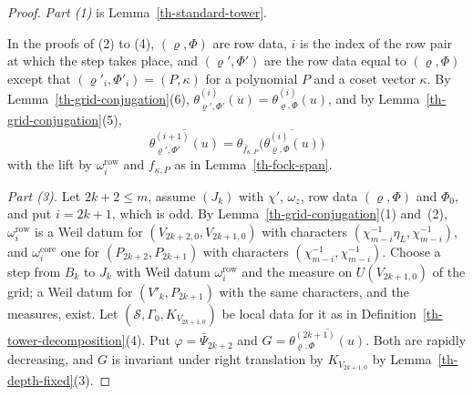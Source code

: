 \begin{proof}
\emph{Part (1)} is Lemma~\ref{th-standard-tower}.

In the proofs of (2) to (4), $(\varrho,\Phi)$ are row data, $i$ is the index of
the row pair at which the step takes place, and $(\varrho',\Phi')$ are the row
data equal to $(\varrho,\Phi)$ except that $(\varrho'_i,\Phi'_i)=(P,\kappa)$ for
a polynomial $P$ and a coset vector $\kappa$. By
Lemma~\ref{th-grid-conjugation}(6),
$\theta^{(i)}_{\varrho',\Phi'}(u)=\theta^{(i)}_{\varrho,\Phi}(u)$, and by
Lemma~\ref{th-grid-conjugation}(5),
\[
\overline{\theta^{(i+1)}_{\varrho',\Phi'}(u)}=\theta_{\bar f_{\kappa,P}}\bigl(\overline{\theta^{(i)}_{\varrho,\Phi}(u)}\bigr)\tag{$*$}
\]
with the lift by $\omega^{\mathrm{row}}_i$ and $f_{\kappa,P}$ as in
Lemma~\ref{th-fock-span}.

\emph{Part (3).} Let $2k+2\leq m$, assume $(J_k)$ with $\chi'$, $\omega_z$,
row data $(\varrho,\Phi)$ and $\Phi_0$, and put $i=2k+1$, which is odd. By
Lemma~\ref{th-grid-conjugation}(1) and~(2), $\omega^{\mathrm{row}}_i$ is a Weil
datum for $(V_{2k+2,0},V_{2k+1,0})$ with characters
$(\chi_{m-i}^{-1}\eta_L,\chi_{m-i}^{-1})$, and $\omega^{\mathrm{core}}_i$ one
for $(P_{2k+2},P_{2k+1})$ with characters $(\chi_{m-i}^{-1},\chi_{m-i}^{-1})$.
Choose a step from $B_k$ to $J_k$ with Weil datum $\omega^{\mathrm{row}}_i$ and
the measure on $U(V_{2k+1,0})$ of the grid; a Weil datum for
$(V'_k,P_{2k+1})$ with the same characters, and the measures, exist. Let
$(\mathcal S,\Gamma_0,K_{V_{2k+1,0}})$ be local data for it as in
Definition~\ref{th-tower-decomposition}(4). Put $\varphi=\bar\Psi_{2k+2}$ and
$G=\overline{\theta^{(2k+1)}_{\varrho,\Phi}(u)}$. Both are rapidly decreasing,
and $G$ is invariant under right translation by $K_{V_{2k+1,0}}$ by
Lemma~\ref{th-depth-fixed}(3).


\end{proof}
